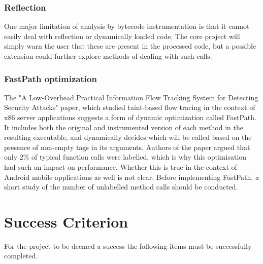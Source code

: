 \documentclass[12pt]{article}
\begin{document}
\subsubsection*{Reflection}

One major limitation of analysis by bytecode instrumentation is that it 
cannot easily deal with reflection or dynamically loaded code. The core
project will simply warn the user that these are present in the processed
code, but a possible extension could further explore methods of dealing 
with such calls.

\subsubsection*{FastPath optimization}

The "A Low-Overhead Practical Information Flow Tracking System for 
Detecting Security Attacks" paper, which studied taint-based flow tracing 
in the context of x86 server applications suggests a form of dynamic 
optimization called FastPath. It includes both the original and 
instrumented version of each method in the resulting executable, and
dynamically decides which will be called based on the presence of non-empty 
tags in its arguments. Authors of the paper argued that only 2\% of typical 
function calls were labelled, which is why this optimisation had such an 
impact on performance. Whether this is true in the context of Android mobile
applications as well is not clear. Before implementing FastPath, a short 
study of the number of unlabelled method calls should be conducted.

\section*{Success Criterion}

For the project to be deemed a success the following items must be
successfully completed.
\end{document}

